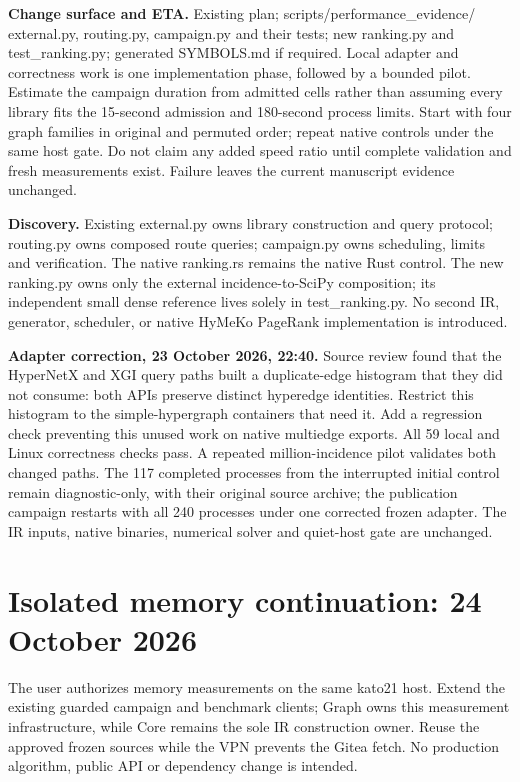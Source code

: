 \documentclass[10pt,a4paper]{article}
\begin{document}
\textbf{Change surface and ETA.} Existing plan; scripts/performance\_evidence/
external.py, routing.py, campaign.py and their tests; new ranking.py and
test\_ranking.py; generated SYMBOLS.md if required. Local adapter and correctness
work is one implementation phase, followed by a bounded pilot. Estimate the
campaign duration from admitted cells rather than assuming every library fits the
15-second admission and 180-second process limits. Start with four graph families
in original and permuted order; repeat native controls under the same host gate.
Do not claim any added speed ratio until complete validation and fresh measurements
exist. Failure leaves the current manuscript evidence unchanged.

\textbf{Discovery.} Existing external.py owns library construction and query
protocol; routing.py owns composed route queries; campaign.py owns scheduling,
limits and verification. The native ranking.rs remains the native Rust control.
The new ranking.py owns only the external incidence-to-SciPy composition; its
independent small dense reference lives solely in test\_ranking.py. No second IR,
generator, scheduler, or native HyMeKo PageRank implementation is introduced.

\textbf{Adapter correction, 23 October 2026, 22:40.} Source review found that
the HyperNetX and XGI query paths built a duplicate-edge histogram that they did
not consume: both APIs preserve distinct hyperedge identities. Restrict this
histogram to the simple-hypergraph containers that need it. Add a regression
check preventing this unused work on native multiedge exports. All 59 local and
Linux correctness checks pass. A repeated million-incidence pilot validates both
changed paths. The 117 completed processes from the interrupted initial control
remain diagnostic-only, with their original source archive; the publication
campaign restarts with all 240 processes under one corrected frozen adapter.
The IR inputs, native binaries, numerical solver and quiet-host gate are unchanged.
\section*{Isolated memory continuation: 24 October 2026}
The user authorizes memory measurements on the same kato21 host. Extend the
existing guarded campaign and benchmark clients; Graph owns this measurement
infrastructure, while Core remains the sole IR construction owner. Reuse the
approved frozen sources while the VPN prevents the Gitea fetch. No production
algorithm, public API or dependency change is intended.
\end{document}

